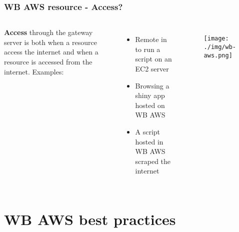 \documentclass[aspectratio=169]{beamer} %
\begin{document}
\begin{frame}
	\frametitle{WB AWS resource - Access?}
	\begin{columns}[c]
		\textbf{Access} through the gateway server is both when a resource access the internet and when a resource is accessed from the internet. 
		\vspace{.5cm}\newline
		Examples:
		\begin{itemize}
			\item Remote in to run a script on an EC2 server
			\item Browsing a shiny app hosted on WB AWS
			\item A script hosted in WB AWS scraped the internet
		\end{itemize}
		
		\begin{figure}
			\centering
			\texttt{[image: ./img/wb-aws.png]}
		\end{figure}
		
	\end{columns}
\end{frame}


\section{WB AWS best practices}
\end{document}
